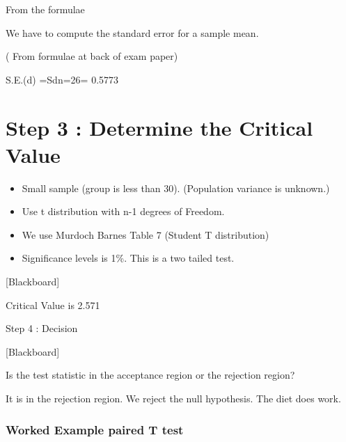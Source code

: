 From the formulae

We have to compute the standard error for a sample mean. 

( From formulae at back of exam paper)

S.E.(d) =Sdn=26= 0.5773 





\section{Step 3 :  Determine the Critical Value}

\begin{itemize}
\item Small sample (group is less than 30).
(Population variance is unknown.)

\item Use t distribution with n-1 degrees of Freedom.

\item We use Murdoch Barnes Table 7 (Student T distribution)

\item Significance levels is 1\%.  This is a two tailed test.

\end{itemize}

[Blackboard]


Critical Value is 2.571


Step 4 : Decision


[Blackboard]

Is the test statistic in the acceptance region or the rejection region?

It is in the rejection region. We reject the null hypothesis. The diet does work.

\subsubsection{Worked Example paired T test}







